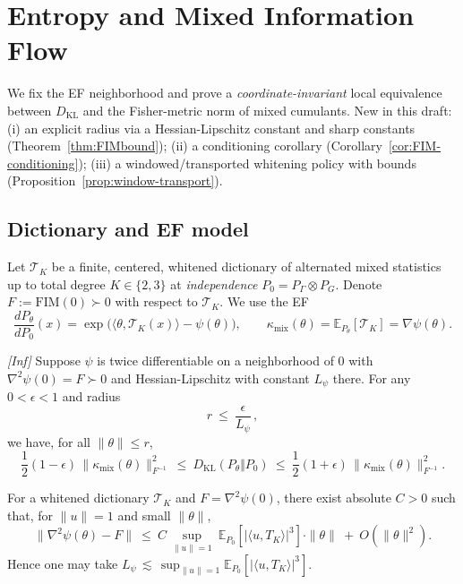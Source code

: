 \section{Entropy and Mixed Information Flow}\label{sec:entropy1}

We fix the EF neighborhood and prove a \emph{coordinate-invariant} local equivalence between $D_{\mathrm{KL}}$ and the Fisher-metric norm of mixed cumulants. New in this draft:
(i) an explicit radius via a Hessian-Lipschitz constant and sharp constants (Theorem~\ref{thm:FIMbound});
(ii) a conditioning corollary (Corollary~\ref{cor:FIM-conditioning});
(iii) a windowed/transported whitening policy with bounds (Proposition~\ref{prop:window-transport}).

\setcounter{theorem}{1}

\subsection{Dictionary and EF model}

Let $\mathcal T_K$ be a finite, centered, whitened dictionary of alternated mixed statistics up to total degree $K\in\{2,3\}$ at \emph{independence} $P_0=P_\Gamma\otimes P_G$. Denote $F:=\mathrm{FIM}(0)\succ0$ with respect to $\mathcal T_K$. We use the EF
\[
\frac{dP_\theta}{dP_0}(x)=\exp\big(\langle \theta,\mathcal T_K(x)\rangle-\psi(\theta)\big),\qquad
\kappa_{\mathrm{mix}}(\theta)=\mathbb E_{P_\theta}[\mathcal T_K]=\nabla\psi(\theta).
\]

\begin{theorem}\label{thm:FIMbound}
\emph{[\textup{Inf}]} Suppose $\psi$ is twice differentiable on a neighborhood of $0$ with $\nabla^2\psi(0)=F\succ0$ and Hessian-Lipschitz with constant $L_\psi$ there. For any $0<\epsilon<1$ and radius
\[
r\ \le\ \frac{\epsilon}{L_\psi}\,,
\]
we have, for all $\|\theta\|\le r$,
\[
\frac12(1-\epsilon)\,\|\kappa_{\mathrm{mix}}(\theta)\|_{F^{-1}}^{2}
\ \le\ D_{\mathrm{KL}}(P_\theta\Vert P_0)\
\le\ \frac12(1+\epsilon)\,\|\kappa_{\mathrm{mix}}(\theta)\|_{F^{-1}}^{2}.
\]
\end{theorem}

\begin{lemma}\label{lem:Lpsi-3rd}
For a whitened dictionary $\mathcal T_K$ and $F=\nabla^2\psi(0)$, there exist absolute $C>0$ such that, for $\|u\|=1$ and small $\|\theta\|$,
\[
\big\|\nabla^2\psi(\theta)-F\big\|\ \le\ C\,\sup_{\|u\|=1}\ \mathbb E_{P_0}\!\left[\big|\langle u, T_K\rangle\big|^3\right]\cdot\|\theta\|\ +\ O(\|\theta\|^2).
\]
Hence one may take $L_\psi \,\lesssim\, \sup_{\|u\|=1}\mathbb E_{P_0}[|\langle u,T_K\rangle|^3]$.
\end{lemma}

